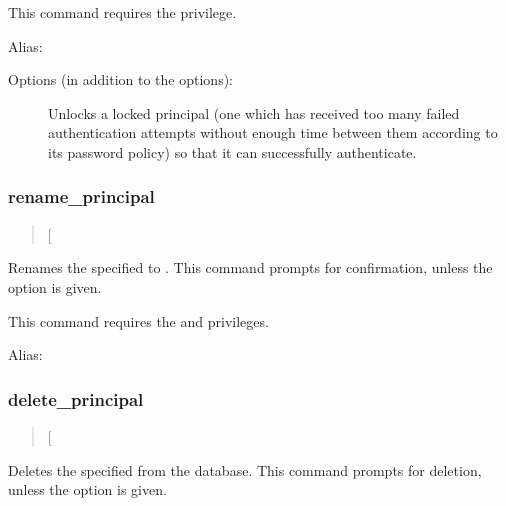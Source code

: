 \documentclass[letterpaper,10pt,english]{sphinxmanual}
\begin{document}
This command requires the  privilege.

Alias: 

Options (in addition to the  options):
\begin{description}
\item[{}] \leavevmode
Unlocks a locked principal (one which has received too many failed
authentication attempts without enough time between them according
to its password policy) so that it can successfully authenticate.

\end{description}


\subsubsection{rename\_principal}
\label{\detokenize{admin/admin_commands/kadmin_local:rename-principal}}\label{\detokenize{admin/admin_commands/kadmin_local:id3}}\begin{quote}

 {[}\sphinxstylestrong{-force}{]}  
\end{quote}

Renames the specified  to .  This
command prompts for confirmation, unless the  option is
given.

This command requires the  and  privileges.

Alias: 


\subsubsection{delete\_principal}
\label{\detokenize{admin/admin_commands/kadmin_local:id4}}\label{\detokenize{admin/admin_commands/kadmin_local:delete-principal}}\begin{quote}

 {[}\sphinxstylestrong{-force}{]} 
\end{quote}

Deletes the specified  from the database.  This command
prompts for deletion, unless the  option is given.
\end{document}
